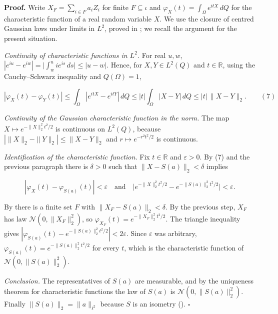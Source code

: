 \documentclass[11pt,a4paper]{article}
\begin{document}
\textbf{Proof.} Write \(X_F=\sum_{i\in F}a_iZ_i\) for finite \(F\subseteq\iota\) and \(\varphi_X(t)=\int_\Omega e^{itX}\,dQ\) for the characteristic function of a real random variable \(X\). We use the closure of centred Gaussian laws under limits in \(L^2\), proved in \cite[Section~3.5.10]{LangevinLean2026ULASC}; we recall the argument for the present situation.




\emph{Continuity of characteristic functions in \(L^2\).} For real \(u,w\), \(|e^{iu}-e^{iw}|=\bigl|\int_w^u ie^{is}\,ds\bigr|\le|u-w|\). Hence, for \(X,Y\in L^2(Q)\) and \(t\in\mathbb R\), using the Cauchy–Schwarz inequality and \(Q(\Omega)=1\),


\[|\varphi_X(t)-\varphi_Y(t)|\le\int_\Omega|e^{itX}-e^{itY}|\,dQ\le|t|\int_\Omega|X-Y|\,dQ\le|t|\,\|X-Y\|_2.\qquad(7)\]


\emph{Continuity of the Gaussian characteristic function in the norm.} The map \(X\mapsto e^{-\|X\|_2^2t^2/2}\) is continuous on \(L^2(Q)\), because \(|\|X\|_2-\|Y\|_2|\le\|X-Y\|_2\) and \(r\mapsto e^{-r^2t^2/2}\) is continuous.




\emph{Identification of the characteristic function.} Fix \(t\in\mathbb R\) and \(\varepsilon>0\). By (7) and the previous paragraph there is \(\delta>0\) such that \(\|X-S(a)\|_2<\delta\) implies


\[|\varphi_X(t)-\varphi_{S(a)}(t)|<\varepsilon\quad\text{and}\quad\bigl|e^{-\|X\|_2^2t^2/2}-e^{-\|S(a)\|_2^2t^2/2}\bigr|<\varepsilon.\]


By \cite[Section~3.6.11]{LangevinLean2026ULASC} there is a finite set \(F\) with \(\|X_F-S(a)\|_2<\delta\). By the previous step, \(X_F\) has law \(\mathcal N(0,\|X_F\|_2^2)\), so \(\varphi_{X_F}(t)=e^{-\|X_F\|_2^2t^2/2}\). The triangle inequality gives \(|\varphi_{S(a)}(t)-e^{-\|S(a)\|_2^2t^2/2}|<2\varepsilon\). Since \(\varepsilon\) was arbitrary, \(\varphi_{S(a)}(t)=e^{-\|S(a)\|_2^2t^2/2}\) for every \(t\), which is the characteristic function of \(\mathcal N(0,\|S(a)\|_2^2)\).




\emph{Conclusion.} The representatives of \(S(a)\) are measurable, and by the uniqueness theorem for characteristic functions the law of \(S(a)\) is \(\mathcal N(0,\|S(a)\|_2^2)\). Finally \(\|S(a)\|_2=\|a\|_{\ell^2}\) because \(S\) is an isometry (\cite[Section~3.6.10]{LangevinLean2026ULASC}). \(\square\)
\end{document}
